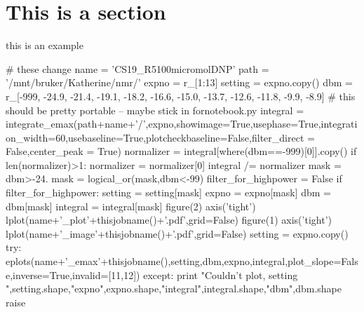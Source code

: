 \section{This is a section}
this is an example

\begin{python}
	# these change
	name = 'CS19_R5100micromolDNP'
	path = '/mnt/bruker/Katherine/nmr/'
	expno = r_[1:13]
	setting = expno.copy()
	dbm = r_[-999,
	  -24.9,
	  -21.4,
	  -19.1,
	  -18.2,
	  -16.6,
	  -15.0,
	  -13.7,
	  -12.6,
	  -11.8,
	  -9.9,
	  -8.9]
	# this should be pretty portable -- maybe stick in fornotebook.py
	integral = integrate_emax(path+name+'/',expno,showimage=True,usephase=True,integration_width=60,usebaseline=True,plotcheckbaseline=False,filter_direct = False,center_peak = True)
	normalizer = integral[where(dbm==-999)[0]].copy()
	if len(normalizer)>1:
	   normalizer = normalizer[0]
	integral /= normalizer
	mask = dbm>-24.
	mask = logical_or(mask,dbm<-99)
	filter_for_highpower = False
	if filter_for_highpower:
	   setting = setting[mask]
	   expno = expno[mask]
	   dbm = dbm[mask]
	   integral = integral[mask]
	figure(2)
	axis('tight')
	lplot(name+'_plot'+thisjobname()+'.pdf',grid=False)
	figure(1)
	axis('tight')
	lplot(name+'_image'+thisjobname()+'.pdf',grid=False)
	setting = expno.copy()
	try:
	   eplots(name+'_emax'+thisjobname(),setting,dbm,expno,integral,plot_slope=False,inverse=True,invalid=[11,12])
	except:
	   print "Couldn't plot, setting ",setting.shape,"expno",expno.shape,"integral",integral.shape,"dbm",dbm.shape
	   raise
\end{python}
